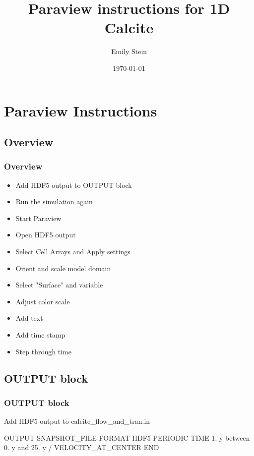 \documentclass{beamer}
\begin{document}
\title{Paraview instructions for 1D Calcite}
\author{Emily Stein}
\date{\today}


\section{Paraview Instructions}

\subsection{Overview}

\begin{frame}\frametitle{Overview}
\begin{itemize}
  \item Add HDF5 output to OUTPUT block
  \item Run the simulation again
  \item Start Paraview
  \item Open HDF5 output
  \item Select Cell Arrays and Apply settings
  \item Orient and scale model domain
  \item Select "Surface" and variable
  \item Adjust color scale
  \item Add text
  \item Add time stamp
  \item Step through time
\end{itemize}

\end{frame}


\subsection{OUTPUT block}

\begin{frame}[fragile]\frametitle{OUTPUT block}
Add HDF5 output to calcite\_flow\_and\_tran.in
\begin{semiverbatim}
OUTPUT
  SNAPSHOT_FILE
    FORMAT HDF5
    PERIODIC TIME 1. y between 0. y and 25. y
  /
  VELOCITY_AT_CENTER
END
\end{semiverbatim}

\end{frame}
\end{document}
